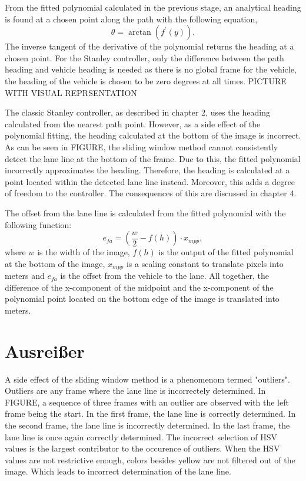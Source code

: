 \documentclass[arbeit=studie,oneside,BCOR=12mm]{ArbeitRST}
\begin{document}
From the fitted polynomial calculated in the previous stage, an analytical
heading is found at a chosen point along the path with the following equation,
\begin{equation}
  \theta = \arctan(f^\prime(y)).
\end{equation}
The inverse tangent of the derivative of
the polynomial returns the heading at a chosen point. For the Stanley
controller, only the difference between the path heading and vehicle heading
is needed as there is no global frame for the vehicle, the heading
of the vehicle is chosen to be zero degrees at all times. PICTURE WITH VISUAL
REPRSENTATION 

The classic Stanley controller, as described in chapter 2, uses the heading
calculated from the nearest path point. However, as a side effect of the
polynomial fitting, the heading calculated at the bottom of the image is
incorrect. As can be seen in FIGURE, the sliding window method cannot consistently
detect the lane line at the bottom of the frame. Due to this, the
fitted polynomial incorrectly approximates the heading. Therefore, the heading
is calculated at a point located within the detected lane line instead.
Moreover, this adds a degree of freedom to the controller. The consequences of
this are discussed in chapter 4.

The offset from the lane line is calculated from the fitted polynomial with
the following function: $$e_{fa} = (\frac{w}{2} - f(h))\cdot x_{mpp},$$ where
$w$ is the width of the image, $f(h)$ is the output of the fitted polynomial
at the bottom of the image, $x_{mpp}$ is a scaling constant to translate
pixels into meters and $e_{fa}$ is the offset from the vehicle to the lane.
All together, the difference of the x-component of the midpoint and the
x-component of the polynomial point located on the bottom edge of the image is
translated into meters.

\section{Ausrei{\ss}er}

\iffalse

A side effect of the sliding window method is a phenomenom termed "outliers".
Outliers are any frame where the lane line is incorrectely determined. In
FIGURE, a sequence of three frames with an outlier are observed with the left
frame being the start. In the first frame, the lane line is correctly
determined. In the second frame, the lane line is incorrectly determined. In
the last frame, the lane line is once again correctly determined. The incorrect
selection of HSV values is the largest contributor to the occurence of
outliers. When the HSV values are not restrictive enough, colors besides yellow
are not filtered out of the image. Which leads to incorrect determination of
the lane line.
\end{document}
